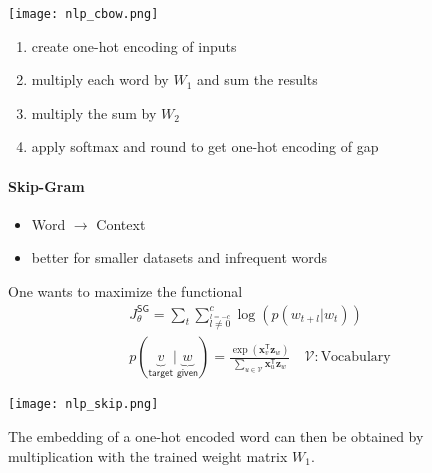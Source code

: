 \newpar{}
\begin{center}
    \texttt{[image: nlp\_cbow.png]}
\end{center}
\begin{enumerate}
    \item create one-hot encoding of inputs
	\item multiply each word by $W_1$ and sum the results 
	\item multiply the sum by $W_2$
	\item apply softmax and round to get one-hot encoding of gap
\end{enumerate}

\paragraph{Skip-Gram}
\begin{itemize}
    \item Word $\to$ Context
    \item better for smaller datasets and infrequent words
\end{itemize}

One wants to maximize the functional
\noindent\begin{gather*}
    J_{\theta}^{\mathsf{SG}} = \sum_{t}\sum_{\overset{l=-c}{l\neq 0}}^{c} \log(p(w_{t+l}|w_t))\\
    p(\underbrace{v}_{\textsf{target}} | \underbrace{w}_{\textsf{given}})  = \frac{\exp(\mathbf{x}_v^{\mathsf{T}}\mathbf{z}_w)}{\sum\limits_{u\in \mathcal{V}} \mathbf{x}_u^{\mathsf{T}}\mathbf{z}_w} \quad \mathcal{V}: \text{Vocabulary}
\end{gather*}

\newpar{}
\begin{center}
    \texttt{[image: nlp\_skip.png]}
\end{center}
The embedding of a one-hot encoded word can then be obtained by multiplication with the trained weight matrix $W_1$.

